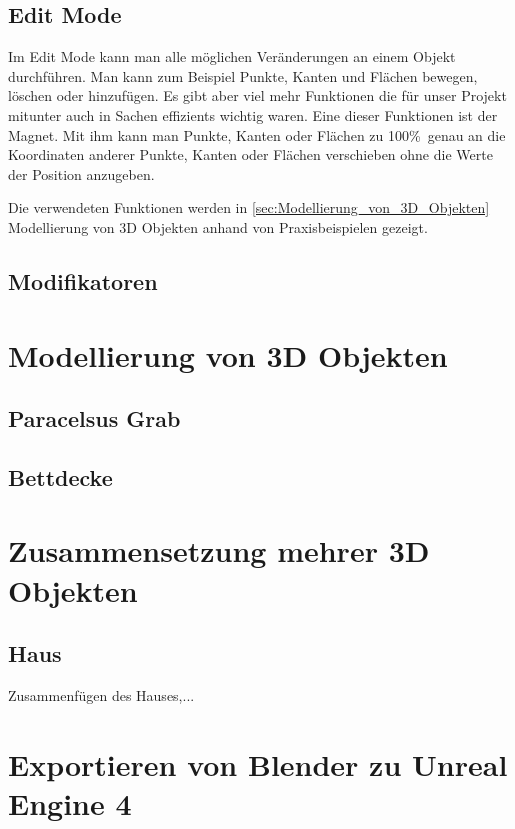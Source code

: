 \subsection{Edit Mode}
Im Edit Mode kann man alle möglichen Veränderungen an einem Objekt durchführen. Man kann zum Beispiel Punkte, Kanten und Flächen bewegen, löschen oder hinzufügen.
Es gibt aber viel mehr Funktionen die für unser Projekt mitunter auch in Sachen effizients wichtig waren. Eine dieser Funktionen ist der Magnet. Mit ihm kann man Punkte, Kanten oder Flächen zu 100\%\ genau an
die Koordinaten anderer Punkte, Kanten oder Flächen verschieben ohne die Werte der Position anzugeben.

Die verwendeten Funktionen werden in  \autoref{sec:Modellierung_von_3D_Objekten} Modellierung von 3D Objekten anhand von
Praxisbeispielen gezeigt.
\subsection{Modifikatoren}
\section{Modellierung von 3D Objekten}
\label{sec:Modellierung_von_3D_Objekten}
\subsection{Paracelsus Grab}
\subsection{Bettdecke}
\section{Zusammensetzung mehrer 3D Objekten}
\subsection{Haus}
Zusammenfügen des Hauses,...
\section{Exportieren von Blender zu Unreal Engine 4}
\label{sec:Exportieren_von_Blender_zu_Unreal_Engine_4}